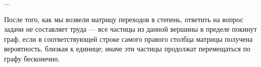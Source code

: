 ...

После того, как мы возвели матрицу переходов в степень, ответить на вопрос задачи не составляет труда --- все частицы из данной вершины в пределе покинут граф, если в соответствующей строке самого правого столбца матрицы получена вероятность, близкая к единице; иначе эти частицы продолжат перемещаться по графу бесконечно. 

\newpage 

